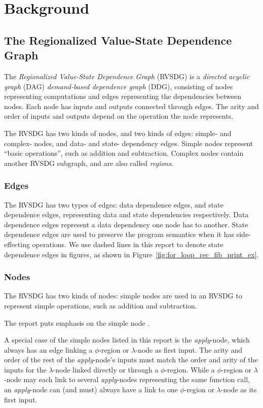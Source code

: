 
\clearpage
\section{Background}
\label{background}

\subsection{The Regionalized Value-State Dependence Graph}
\label{background:RVSDG}

The \textit{Regionalized Value-State Dependence Graph} (RVSDG) is a
\textit{directed acyclic graph} (DAG) \textit{demand-based dependence graph}
(DDG), consisting of nodes representing computations and edges representing the
dependencies between nodes. Each node has inputs and outputs connected through
edges. The arity and order of inputs and outputs depend on the operation the
node represents.

The RVSDG has two kinds of nodes, and two kinds of edges: simple- and complex-
nodes, and data- and state- dependency edges. Simple nodes represent ``basic
operations'', such as addition and subtraction. Complex nodes contain another
RVSDG subgraph, and are also called \textit{regions}.

\subsubsection{Edges}

The RVSDG has two types of edges: data dependence edges, and state dependence
edges, representing data and state dependencies respectively. Data dependence
edges represent a data dependency one node has to another. State dependence
edges are used to preserve the program semantics when it has side-effecting
operations. We use dashed lines in this report to denote state dependence edges
in figures, as shown in Figure~\ref{fig:for_loop_rec_fib_print_ex}.

\subsubsection{Nodes}

The RVSDG has two kinds of nodes: simple nodes are used in an RVSDG to represent
simple operations, such as addition and subtraction.

The report puts emphasis on the simple node \applyNode .

A special case of the simple nodes listed in this report is the
\textit{apply}-node, which always has an edge linking a $\phi$-region or
$\lambda$-node as first input. The arity and order of the rest of the
\textit{apply}-node's inputs must match the order and arity of the inputs for
the $\lambda$-node linked directly or through a $\phi$-region. While a
$\phi$-region or $\lambda$-node may each link to several \textit{apply}-nodes
representing the same function call, an \textit{apply}-node can (and must)
always have a link to one $\phi$-region or $\lambda$-node as its first input.

